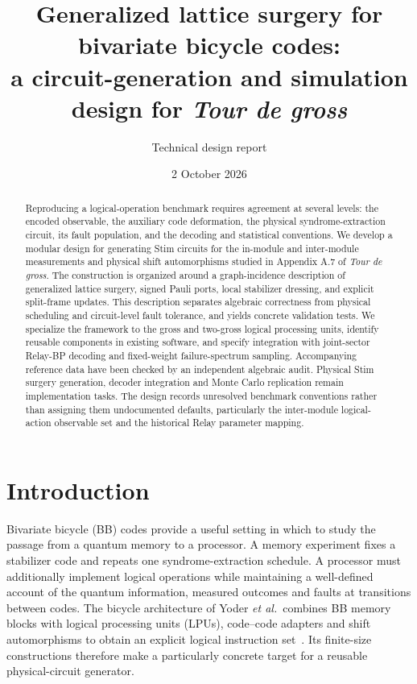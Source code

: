 \documentclass[11pt,a4paper]{article}
\title{Generalized lattice surgery for bivariate bicycle codes:\\a circuit-generation and simulation design for \emph{Tour de gross}}
\author{Technical design report}
\date{2 October 2026}
\begin{document}
\maketitle
\begin{abstract}
Reproducing a logical-operation benchmark requires agreement at several levels: the encoded observable, the auxiliary code deformation, the physical syndrome-extraction circuit, its fault population, and the decoding and statistical conventions. We develop a modular design for generating Stim circuits for the in-module and inter-module measurements and physical shift automorphisms studied in Appendix A.7 of \emph{Tour de gross}. The construction is organized around a graph-incidence description of generalized lattice surgery, signed Pauli ports, local stabilizer dressing, and explicit split-frame updates. This description separates algebraic correctness from physical scheduling and circuit-level fault tolerance, and yields concrete validation tests. We specialize the framework to the gross and two-gross logical processing units, identify reusable components in existing software, and specify integration with joint-sector Relay-BP decoding and fixed-weight failure-spectrum sampling. Accompanying reference data have been checked by an independent algebraic audit. Physical Stim surgery generation, decoder integration and Monte Carlo replication remain implementation tasks. The design records unresolved benchmark conventions rather than assigning them undocumented defaults, particularly the inter-module logical-action observable set and the historical Relay parameter mapping.
\end{abstract}

\section{Introduction}

Bivariate bicycle (BB) codes provide a useful setting in which to study the passage from a quantum memory to a processor. A memory experiment fixes a stabilizer code and repeats one syndrome-extraction schedule. A processor must additionally implement logical operations while maintaining a well-defined account of the quantum information, measured outcomes and faults at transitions between codes. The bicycle architecture of Yoder \emph{et al.}\ combines BB memory blocks with logical processing units (LPUs), code--code adapters and shift automorphisms to obtain an explicit logical instruction set~\cite{tdg}. Its finite-size constructions therefore make a particularly concrete target for a reusable physical-circuit generator.
\end{document}
